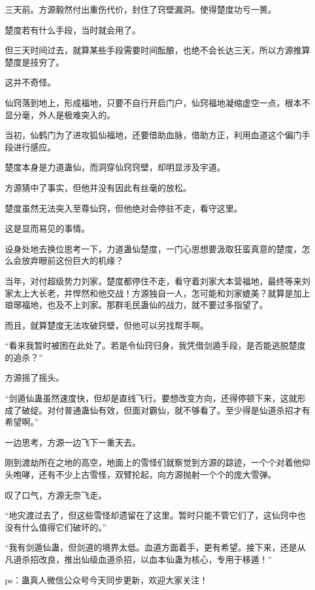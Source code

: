 \begin{this_body}
三天前。方源毅然付出重伤代价，封住了窍壁漏洞。使得楚度功亏一篑。

楚度若有什么手段，当时就会用了。

但三天时间过去，就算某些手段需要时间酝酿，也绝不会长达三天，所以方源推算楚度是技穷了。

这并不奇怪。

仙窍落到地上，形成福地，只要不自行开启门户，仙窍福地凝缩虚空一点，根本不显分毫，外人是极难突入的。

当初，仙鹤门为了进攻狐仙福地，还要借助血脉，借助方正，利用血道这个偏门手段进行感应。

楚度本身是力道蛊仙，而洞穿仙窍窍壁，却明显涉及宇道。

方源猜中了事实，但他并没有因此有丝毫的放松。

楚度虽然无法突入至尊仙窍，但他绝对会停驻不走，看守这里。

这是显而易见的事情。

设身处地去换位思考一下，力道蛊仙楚度，一门心思想要汲取狂蛮真意的楚度，怎么会放弃眼前这份巨大的机缘？

当年，对付超级势力刘家，楚度都停住不走，看守着刘家大本营福地，最终等来刘家太上大长老，并悍然和他交战！方源独自一人，怎可能和刘家媲美？就算是加上琅琊福地，也及不上刘家。那群毛民蛊仙的战力，就不要过多指望了。

而且，就算楚度无法攻破窍壁，但他可以另找帮手啊。

“看来我暂时被困在此处了。若是令仙窍归身，我凭借剑遁手段，是否能逃脱楚度的追杀？”

方源摇了摇头。

“剑遁仙蛊虽然速度快，但却是直线飞行。要想改变方向，还得停顿下来，这就形成了破绽。对付普通蛊仙有效，但面对霸仙，就不够看了。至少得是仙道杀招才有希望啊。”

一边思考，方源一边飞下一重天去。

刚到渡劫所在之地的高空，地面上的雪怪们就察觉到方源的踪迹，一个个对着他仰头咆哮，还有不少上古雪怪，双臂抡起，向方源抛射一个个的庞大雪弹。

叹了口气，方源无奈飞走。

“地灾渡过去了，但这些雪怪却遗留在了这里。暂时只能不管它们了，这仙窍中也没有什么值得它们破坏的。”

“我有剑遁仙蛊，但剑道的境界太低。血道方面着手，更有希望。接下来，还是从凡道杀招改良，推出仙级血道杀招，以血本仙蛊为核心，专用于移遁！”

ps：蛊真人微信公众号今天同步更新，欢迎大家关注！

\end{this_body}

